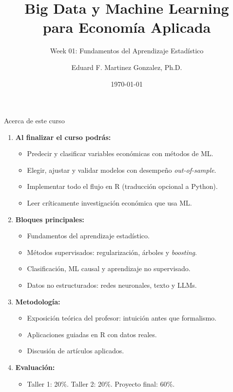 \documentclass{beamer}
\title[BDML]{Big Data y Machine Learning \\ para Economía Aplicada}
\subtitle{Week 01: Fundamentos del Aprendizaje Estadístico}
\author{Eduard F. Martinez Gonzalez, Ph.D.}
\institute[]{Departamento de Economía, Universidad Icesi}
\date{\today}
\newcommand{\1}{\mathbb{I}}
\begin{document}
\begin{frame}
\titlepage
\end{frame}


\begin{frame}{Acerca de este curso}
\begin{enumerate}
\item \textbf{Al finalizar el curso podrás:}
\begin{itemize}
  \item Predecir y clasificar variables económicas con métodos de ML.
  \item Elegir, ajustar y validar modelos con desempeño \emph{out-of-sample}.
  \item Implementar todo el flujo en R (traducción opcional a Python).
  \item Leer críticamente investigación económica que usa ML.
\end{itemize}
\item \textbf{Bloques principales:}
\begin{itemize}
  \item Fundamentos del aprendizaje estadístico.
  \item Métodos supervisados: regularización, árboles y \emph{boosting}.
  \item Clasificación, ML causal y aprendizaje no supervisado.
  \item Datos no estructurados: redes neuronales, texto y LLMs.
\end{itemize}
\item \textbf{Metodología:}
\begin{itemize}
  \item Exposición teórica del profesor: intuición antes que formalismo.
  \item Aplicaciones guiadas en R con datos reales.
  \item Discusión de artículos aplicados.
\end{itemize}
\item \textbf{Evaluación:}
\begin{itemize}
  \item Taller 1: 20\%. \quad Taller 2: 20\%. \quad Proyecto final: 60\%.
\end{itemize}
\end{enumerate}
\end{frame}
\end{document}
